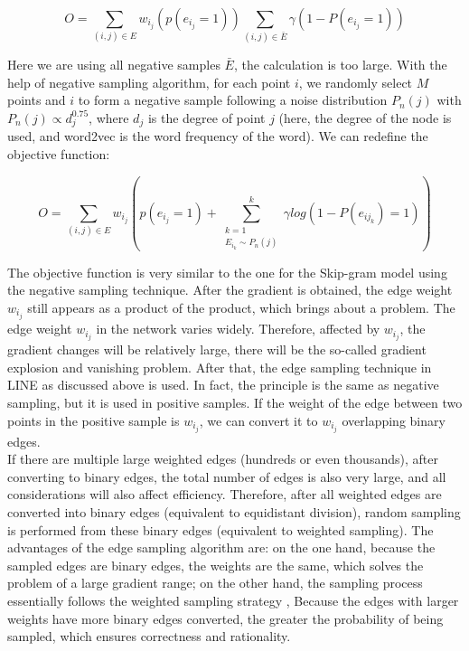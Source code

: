 \begin{equation*}
    O =  \sum_{(i,j)∈E}  w_i_j(p(e_i_j = 1)) \sum_{(i,j)∈\bar E} \gamma (1 - P(e_i_j = 1))
\end{equation*}

\noindent Here we are using all negative samples $\bar E$, the calculation is too large. With the help of negative sampling algorithm, for each point $i$, we randomly select $M$ points and $i$ to form a negative sample following a noise distribution $P_n(j)$ with $P_n(j)∝d_j^{0. 75}$, where $d_j$ is the degree of point $j$ (here, the degree of the node is used, and word2vec is the word frequency of the word). We can redefine the objective function:

\begin{equation*}
    O =  \sum_{(i,j)∈E}  w_i_j(p(e_i_j = 1)  +\sum^k_{\substack{k=1\\ {E_{i_k} \sim P_n(j)}}} \gamma log (1 - P(e_{ij_{k}}) = 1))
\end{equation*}

\noindent The objective function is very similar to the one for the Skip-gram model using the negative sampling technique. After the gradient is obtained, the edge weight $w_i_j$ still appears as a product of the product, which brings about a problem. The edge weight $w_i_j$ in the network varies widely. Therefore, affected by $w_i_j$, the gradient changes will be relatively large, there will be the so-called gradient explosion and vanishing problem. After that, the edge sampling technique in LINE as discussed above is used. In fact, the principle is the same as negative sampling, but it is used in positive samples. If the weight of the edge between two points in the positive sample is $w_i_j$, we can convert it to $w_i_j$ overlapping binary edges.\\

\noindent If there are multiple large weighted edges (hundreds or even thousands), after converting to binary edges, the total number of edges is also very large, and all considerations will also affect efficiency. Therefore, after all weighted edges are converted into binary edges (equivalent to equidistant division), random sampling is performed from these binary edges (equivalent to weighted sampling). The advantages of the edge sampling algorithm are: on the one hand, because the sampled edges are binary edges, the weights are the same, which solves the problem of a large gradient range; on the other hand, the sampling process essentially follows the weighted sampling strategy , Because the edges with larger weights have more binary edges converted, the greater the probability of being sampled, which ensures correctness and rationality.\\

